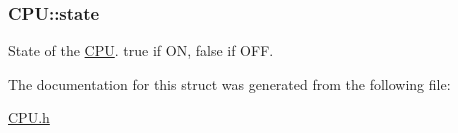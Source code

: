 \subsubsection[{state}]{ C\+P\+U\+::state}\label{structCPU_a1e09d96a128cb75989259ab544a68cc8}
State of the \hyperlink{structCPU}{C\+P\+U}. true if O\+N, false if O\+F\+F. 

The documentation for this struct was generated from the following file\+:\begin{DoxyCompactItemize}
\item 
\hyperlink{CPU_8h}{C\+P\+U.\+h}\end{DoxyCompactItemize}
